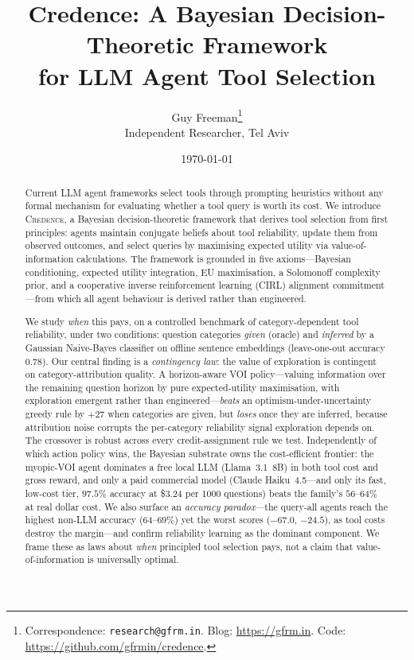 \documentclass[11pt]{article}
\title{Credence: A Bayesian Decision-Theoretic Framework \\for LLM Agent Tool Selection}
\author{
  Guy Freeman\thanks{Correspondence: \texttt{research@gfrm.in}. Blog: \url{https://gfrm.in}. Code: \url{https://github.com/gfrmin/credence}.} \\
  Independent Researcher, Tel Aviv
}
\date{\today}
\newcommand{\credence}{\textsc{Credence}}
\begin{document}
\maketitle

\begin{abstract}
Current LLM agent frameworks select tools through prompting heuristics without any formal mechanism for evaluating whether a tool query is worth its cost. We introduce \credence{}, a Bayesian decision-theoretic framework that derives tool selection from first principles: agents maintain conjugate beliefs about tool reliability, update them from observed outcomes, and select queries by maximising expected utility via value-of-information calculations. The framework is grounded in five axioms---Bayesian conditioning, expected utility integration, EU maximisation, a Solomonoff complexity prior, and a cooperative inverse reinforcement learning (CIRL) alignment commitment---from which all agent behaviour is derived rather than engineered.

We study \emph{when} this pays, on a controlled benchmark of category-dependent tool reliability, under two conditions: question categories \emph{given} (oracle) and \emph{inferred} by a Gaussian Naive-Bayes classifier on offline sentence embeddings (leave-one-out accuracy $0.78$). Our central finding is a \emph{contingency law}: the value of exploration is contingent on category-attribution quality. A horizon-aware VOI policy---valuing information over the remaining question horizon by pure expected-utility maximisation, with exploration emergent rather than engineered---\emph{beats} an optimism-under-uncertainty greedy rule by $+27$ when categories are given, but \emph{loses} once they are inferred, because attribution noise corrupts the per-category reliability signal exploration depends on. The crossover is robust across every credit-assignment rule we test. Independently of which action policy wins, the Bayesian substrate owns the cost-efficient frontier: the myopic-VOI agent dominates a free local LLM (Llama~3.1~8B) in both tool cost and gross reward, and only a paid commercial model (Claude Haiku~4.5---and only its fast, low-cost tier, $97.5\%$ accuracy at \$3.24 per 1000 questions) beats the family's $56$--$64\%$ at real dollar cost. We also surface an \emph{accuracy paradox}---the query-all agents reach the highest non-LLM accuracy ($64$--$69\%$) yet the worst scores ($-67.0$, $-24.5$), as tool costs destroy the margin---and confirm reliability learning as the dominant component. We frame these as laws about \emph{when} principled tool selection pays, not a claim that value-of-information is universally optimal.
\end{abstract}
\end{document}

